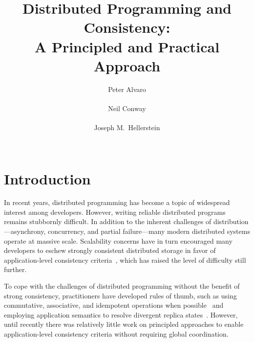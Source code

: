 \documentclass{sig-alternate}
\begin{document}
\title{Distributed Programming and Consistency:\\A Principled and Practical Approach}

\author{
\alignauthor
Peter Alvaro\\
        \\
\alignauthor
Neil Conway\\
        \\
\alignauthor
Joseph M.\ Hellerstein\\
        \\
}

\maketitle

\section{Introduction}

In recent years, distributed programming has become a topic of widespread
interest among developers. However, writing reliable distributed programs
remains stubbornly difficult. In addition to the inherent challenges of
distribution---asynchrony, concurrency, and partial failure---many modern
distributed systems operate at massive scale. Scalability concerns have in turn
encouraged many developers to eschew strongly consistent distributed storage in
favor of application-level consistency criteria~\cite{Birman2009,Helland2009,vogels},
which has raised the level of difficulty still further.

To cope with the challenges of distributed programming without the benefit of
strong consistency, practitioners have developed rules of thumb, such as using
commutative, associative, and idempotent operations when
possible~\cite{Helland2009,Pritchett2008} and employing application semantics to
resolve divergent replica states~\cite{DeCandia2007}. However, until recently
there was relatively little work on principled approaches to enable
application-level consistency criteria without requiring global coordination.
\end{document}

